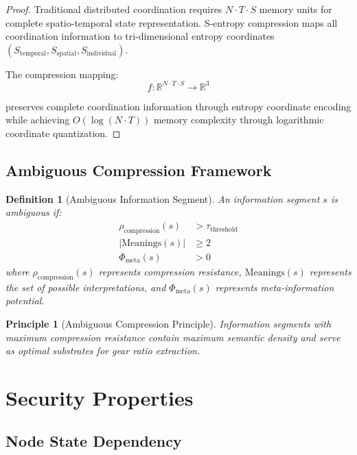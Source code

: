 \documentclass[12pt,a4paper]{article}
\newtheorem{definition}{Definition}
\newtheorem{principle}{Principle}
\begin{document}
\begin{proof}
Traditional distributed coordination requires $N \cdot T \cdot S$ memory units for complete spatio-temporal state representation. S-entropy compression maps all coordination information to tri-dimensional entropy coordinates $(S_{\text{temporal}}, S_{\text{spatial}}, S_{\text{individual}})$.

The compression mapping:
\begin{equation}
f: \mathbb{R}^{N \cdot T \cdot S} \rightarrow \mathbb{R}^3
\end{equation}

preserves complete coordination information through entropy coordinate encoding while achieving $O(\log(N \cdot T))$ memory complexity through logarithmic coordinate quantization.
\end{proof}

\subsection{Ambiguous Compression Framework}

\begin{definition}[Ambiguous Information Segment]
An information segment $s$ is ambiguous if:
\begin{align}
\rho_{\text{compression}}(s) &> \tau_{\text{threshold}} \\
|\text{Meanings}(s)| &\geq 2 \\
\Phi_{\text{meta}}(s) &> 0
\end{align}
where $\rho_{\text{compression}}(s)$ represents compression resistance, $\text{Meanings}(s)$ represents the set of possible interpretations, and $\Phi_{\text{meta}}(s)$ represents meta-information potential.
\end{definition}

\begin{principle}[Ambiguous Compression Principle]
Information segments with maximum compression resistance contain maximum semantic density and serve as optimal substrates for gear ratio extraction.
\end{principle}

\section{Security Properties}

\subsection{Node State Dependency}
\end{document}
